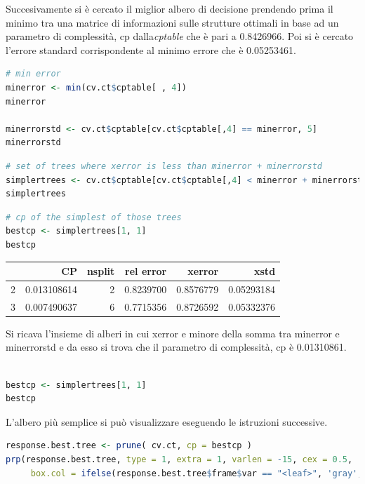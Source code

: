 \documentclass[letterpaper,11pt]{article}
\begin{document}
Succesivamente si è cercato il miglior albero di decisione prendendo prima il minimo tra una matrice di informazioni sulle strutture ottimali in base ad un parametro di complessità, cp dalla\textit{cptable} che è pari a 0.8426966.
Poi si è cercato l'errore standard corrispondente al minimo errore che è 0.05253461.  

\begin{lstlisting}[language=R]
# min error
minerror <- min(cv.ct$cptable[ , 4])
minerror

minerrorstd <- cv.ct$cptable[cv.ct$cptable[,4] == minerror, 5]
minerrorstd
\end{lstlisting}

\begin{lstlisting}[language=R]
# set of trees where xerror is less than minerror + minerrorstd
simplertrees <- cv.ct$cptable[cv.ct$cptable[,4] < minerror + minerrorstd, ]
simplertrees
\end{lstlisting}


\begin{lstlisting}[language=R]
# cp of the simplest of those trees
bestcp <- simplertrees[1, 1]
bestcp
\end{lstlisting}
\begin{table}[ht]
\centering
\begin{tabular}{rrrrrr}
  \hline
 & CP & nsplit & rel error & xerror & xstd \\ 
  \hline
  2 & 0.013108614 & 2 & 0.8239700 & 0.8576779 & 0.05293184 \\ 
  3 & 0.007490637  & 6 & 0.7715356 & 0.8726592 & 0.05332376\\ 
  
   \hline
\end{tabular}
\end{table}

Si ricava l'insieme di alberi in cui xerror e minore della somma tra minerror e minerrorstd e da esso si trova che il parametro di complessità, cp è 0.01310861. 

\begin{lstlisting}[language=R]

bestcp <- simplertrees[1, 1]
bestcp
\end{lstlisting}

L'albero più semplice si può visualizzare eseguendo le istruzioni successive.

\begin{lstlisting}[language=R]
response.best.tree <- prune( cv.ct, cp = bestcp )
prp(response.best.tree, type = 1, extra = 1, varlen = -15, cex = 0.5,
     box.col = ifelse(response.best.tree$frame$var == "<leaf>", 'gray', 'white' ))
\end{lstlisting}
\end{document}
